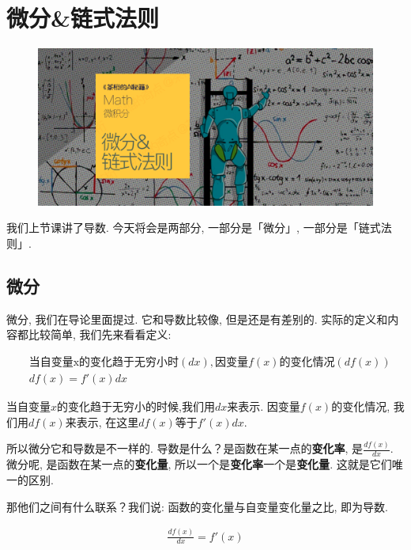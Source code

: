 \chapter{微分\&链式法则}

\begin{figure}[ht]
  \centering
  \includegraphics[width=1\linewidth]{asset/20230830172226.png}
\end{figure}

\newpage

我们上节课讲了导数. 今天将会是两部分, 一部分是「微分」, 一部分是「链式法则」. 

\section{微分}

微分, 我们在导论里面提过. 它和导数比较像, 但是还是有差别的. 实际的定义和内容都比较简单, 我们先来看看定义:

\begin{align*}
  & \mbox{当自变量x的变化趋于无穷小时}(dx), \mbox{因变量}f(x)\mbox{的变化情况}(df(x)) \\
  & df(x) = f'(x)dx
\end{align*}

当自变量$x$的变化趋于无穷小的时候,我们用$dx$来表示. 因变量$f(x)$的变化情况, 我们用$df(x)$来表示, 在这里$df(x)$等于$f'(x)dx$. 

所以微分它和导数是不一样的. 导数是什么？是函数在某一点的\textbf{变化率}, 是$\frac{df(x)}{dx}$. 微分呢, 是函数在某一点的\textbf{变化量}, 所以一个是\textbf{变化率}一个是\textbf{变化量}. 这就是它们唯一的区别. 

那他们之间有什么联系？我们说: 函数的变化量与自变量变化量之比, 即为导数. 

\begin{align*}
  \frac{df(x)}{dx} = f'(x)
\end{align*}


